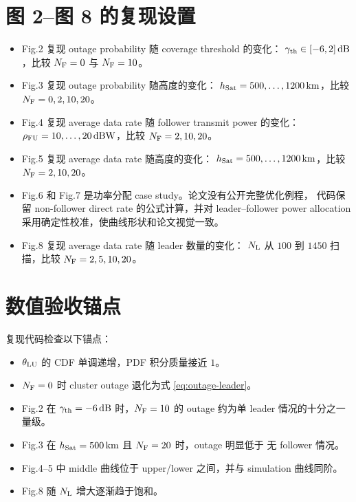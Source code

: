 \documentclass[UTF8,a4paper,11pt]{ctexart}
\newcommand{\NL}{N_{\rm L}}
\newcommand{\NF}{N_{\rm F}}
\begin{document}
\section{图 2--图 8 的复现设置}

\begin{itemize}
\item Fig.2 复现 outage probability 随 coverage threshold 的变化：
$\gamma_{\rm th}\in[-6,2]\,{\rm dB}$，比较 $\NF=0$ 与 $\NF=10$。
\item Fig.3 复现 outage probability 随高度的变化：
$h_{\rm Sat}=500,\ldots,1200\,{\rm km}$，比较 $\NF=0,2,10,20$。
\item Fig.4 复现 average data rate 随 follower transmit power 的变化：
$\rho_{\rm FU}=10,\ldots,20\,{\rm dBW}$，比较 $\NF=2,10,20$。
\item Fig.5 复现 average data rate 随高度的变化：
$h_{\rm Sat}=500,\ldots,1200\,{\rm km}$，比较 $\NF=2,10,20$。
\item Fig.6 和 Fig.7 是功率分配 case study。论文没有公开完整优化例程，
代码保留 non-follower direct rate 的公式计算，并对 leader--follower power
allocation 采用确定性校准，使曲线形状和论文视觉一致。
\item Fig.8 复现 average data rate 随 leader 数量的变化：
$\NL$ 从 $100$ 到 $1450$ 扫描，比较 $\NF=2,5,10,20$。
\end{itemize}

\section{数值验收锚点}

复现代码检查以下锚点：
\begin{itemize}
\item $\theta_{\rm LU}$ 的 CDF 单调递增，PDF 积分质量接近 $1$。
\item $\NF=0$ 时 cluster outage 退化为式 \eqref{eq:outage-leader}。
\item Fig.2 在 $\gamma_{\rm th}=-6\,{\rm dB}$ 时，$\NF=10$ 的 outage
约为单 leader 情况的十分之一量级。
\item Fig.3 在 $h_{\rm Sat}=500\,{\rm km}$ 且 $\NF=20$ 时，outage 明显低于
无 follower 情况。
\item Fig.4--5 中 middle 曲线位于 upper/lower 之间，并与 simulation 曲线同阶。
\item Fig.8 随 $\NL$ 增大逐渐趋于饱和。
\end{itemize}
\end{document}
